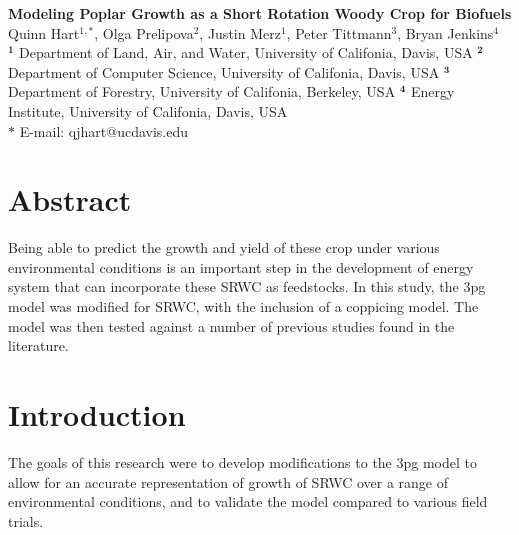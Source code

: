 \documentclass[10pt]{article}
\date{}
\begin{document}
\begin{flushleft}
{\Large
\textbf{Modeling Poplar Growth as a Short Rotation Woody Crop for Biofuels}
}
\\
Quinn Hart$^{1,\ast}$,
Olga Prelipova$^{2}$,
Justin Merz$^{1}$,
Peter Tittmann$^{3}$, 
Bryan Jenkins$^{4}$
\\
$^{\textbf{1}}$ Department of Land, Air, and Water, University of Califonia, Davis, USA
$^{\textbf{2}}$ Department of Computer Science, University of Califonia, Davis, USA
$^{\textbf{3}}$ Department of Forestry, University of Califonia, Berkeley, USA
$^{\textbf{4}}$ Energy Institute, University of Califonia, Davis, USA
\\
$\ast$ E-mail: qjhart@ucdavis.edu
\end{flushleft}

\section*{Abstract}

Being able to predict the growth and yield of these crop under various
environmental conditions is an important step in the development of
energy system that can incorporate these \ac{SRWC} as feedstocks.  In
this study, the \acf{3pg} model was modified for \ac{SRWC}, with the
inclusion of a coppicing model.  The model was then tested against a
number of previous studies found in the literature.  


\section*{Introduction}

The goals of this research were to develop modifications to the
\ac{3pg} model to allow for an accurate representation of growth of
\ac{SRWC} over a range of environmental conditions, and to validate
the model compared to various field trials.
\end{document}
